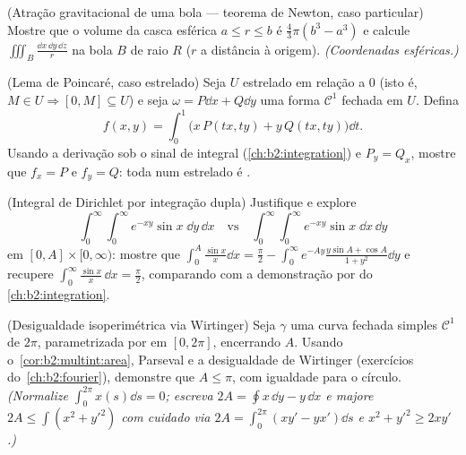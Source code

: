 \begin{exercise}[$\star\star$]\label{exo:b2:multint:7}
(Atração gravitacional de uma bola --- teorema de Newton, caso
particular) Mostre que o volume da casca esférica $a \leq r \leq
b$ é $\frac43\pi(b^3 - a^3)$ e calcule $\iiint_{B}
\frac{\dd x\,\dd y\,\dd z}{r}$ na bola $B$ de raio $R$
($r$ a distância à origem). \emph{(Coordenadas
esféricas.)}
\end{exercise}

\begin{exercise}[$\star\star\star$]\label{exo:b2:multint:8}
(Lema de Poincaré, caso estrelado) Seja $U$ estrelado em
relação a $0$ (isto é, $M \in U \Rightarrow [0, M] \subseteq U$)
e seja $\omega = P\dd x + Q\dd y$ uma forma $\mathcal{C}^1$ fechada em
$U$. Defina
\[
f(x, y) = \int_0^1 \bigl(x\,P(tx, ty) + y\,Q(tx, ty)\bigr)\dd t .
\]
Usando a derivação sob o sinal de integral
(\cref{ch:b2:integration}) e $P_y = Q_x$, mostre que $f_x = P$
e $f_y = Q$: toda  num  estrelado é
.
\end{exercise}

\begin{exercise}[$\star\star\star$]\label{exo:b2:multint:9}
(Integral de Dirichlet por integração dupla) Justifique e explore
\[
\int_0^\infty\!\!\int_0^\infty e^{-xy}\sin x\;\dd y\,\dd x
\quad\text{vs}\quad
\int_0^\infty\!\!\int_0^\infty e^{-xy}\sin x\;\dd x\,\dd y
\]
em $[0, A] \times [0, \infty)$: mostre que $\int_0^A \frac{\sin
x}{x}\dd x = \frac\pi2 - \int_0^\infty
e^{-Ay}\frac{y\sin A + \cos A}{1 + y^2}\dd y$ e recupere
$\int_0^\infty \frac{\sin x}{x}\,\dd x = \frac\pi2$, comparando
com a demonstração por  do
\cref{ch:b2:integration}.
\end{exercise}

\begin{exercise}[$\star\star\star$]\label{exo:b2:multint:10}
(Desigualdade isoperimétrica via Wirtinger) Seja $\gamma$ uma curva
fechada simples $\mathcal{C}^1$ de  $2\pi$, parametrizada por  em $[0, 2\pi]$, encerrando  $A$. Usando
o~\cref{cor:b2:multint:area}, Parseval e a desigualdade de Wirtinger
(exercícios do~\cref{ch:b2:fourier}), demonstre que $A \leq \pi$, com
igualdade para o círculo. \emph{(Normalize $\int_0^{2\pi} x(s)\dd s
= 0$; escreva $2A = \oint x\,\dd y - y\,\dd x$ e majore $2A \leq
\int (x^2 + y'^2)$ com cuidado via $2A = \int_0^{2\pi}(xy' - yx')\dd
s$ e $x^2 + y'^2 \geq 2xy'$.)}
\end{exercise}

